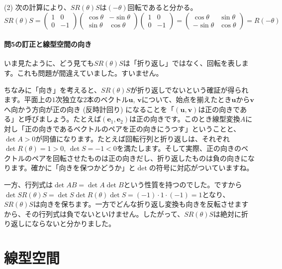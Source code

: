 \noindent (2) 次の計算により、$SR(\theta)S$は$(-\theta)$回転であると分かる。
\[
SR(\theta)S = 
\begin{pmatrix}
1 & 0 \\
0 & -1
\end{pmatrix}
\begin{pmatrix}
\cos\theta & -\sin\theta \\
\sin\theta & \cos\theta
\end{pmatrix}
\begin{pmatrix}
1 & 0 \\
0 & -1
\end{pmatrix}
=
\begin{pmatrix}
\cos\theta & \sin\theta \\
-\sin\theta & \cos\theta
\end{pmatrix}
= R(-\theta)
\]

\paragraph{問5の訂正と線型空間の向き} いま見たように、どう見ても$SR(\theta)S$は「折り返し」ではなく、回転を表します。これも問題が間違えていました。すいません。

ちなみに「向き」を考えると、$SR(\theta)S$が折り返しでないという確証が得られます。平面上の$1$次独立な$2$本のベクトル$\bm{u}$, $\bm{v}$について、始点を揃えたとき$\bm{u}$から$\bm{v}$へ向かう方向が正の向き (反時計回り) になることを「$(\bm{u}, \bm{v})$は正の向きである」と呼びましょう。たとえば$(\bm{e}_1, \bm{e}_2)$は正の向きです。このとき線型変換$A$に対し「正の向きであるベクトルのペアを正の向きにうつす」ということと、$\det A>0$が同値になります。たとえば回転行列と折り返しは、それぞれ$\det R(\theta) = 1 > 0$, $\det S = -1 <0$を満たします。そして実際、正の向きのベクトルのペアを回転させたものは正の向きだし、折り返したものは負の向きになります。確かに「向きを保つかどうか」と$\det$の符号に対応がついていますね。

一方、行列式は$\det AB = \det A \det B$という性質を持つのでした。ですから$\det S R(\theta) S = \det S \det R(\theta) \det S = (-1)\cdot 1\cdot (-1) = 1$となり、$S R(\theta) S$は向きを保ちます。一方でどんな折り返し変換も向きを反転させますから、その行列式は負でないといけません。したがって、$S R(\theta) S$は絶対に折り返しにならないと分かりました。

\section{線型空間}

